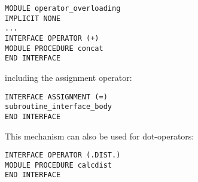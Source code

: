 \begin{verbatim}
MODULE operator_overloading
IMPLICIT NONE
...
INTERFACE OPERATOR (+)
MODULE PROCEDURE concat
END INTERFACE
\end{verbatim}

including the assignment operator:

\begin{verbatim}
INTERFACE ASSIGNMENT (=) 
subroutine_interface_body
END INTERFACE
\end{verbatim}

This mechanism can also be used for dot-operators:

\begin{verbatim}
INTERFACE OPERATOR (.DIST.)
MODULE PROCEDURE calcdist
END INTERFACE
\end{verbatim}


